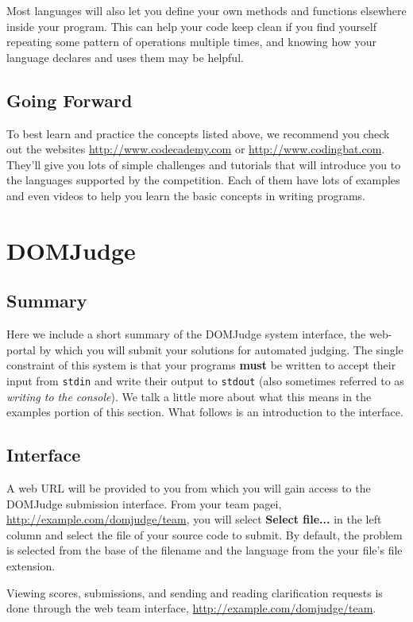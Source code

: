 \documentclass[a4paper]{article}
\begin{document}
Most languages will also let you define your own methods and functions elsewhere inside your program. This can help your code keep clean if you find yourself repeating some pattern of operations multiple times, and knowing how your language declares and uses them may be helpful.

\subsection{Going Forward}
To best learn and practice the concepts listed above, we recommend you check out the websites \url{http://www.codecademy.com} or \url{http://www.codingbat.com}. They'll give you lots of simple challenges and tutorials that will introduce you to the languages supported by the competition. Each of them have lots of examples and even videos to help you learn the basic concepts in writing programs.

\section{DOMJudge}
\subsection{Summary}
Here we include a short summary of the DOMJudge system interface, the web-portal by which you will submit your solutions for automated judging. The single constraint of this system is that your programs \textbf{must} be written to accept their input from \texttt{stdin} and write their output to \texttt{stdout} (also sometimes referred to as \textit{writing to the console}). We talk a little more about what this means in the examples portion of this section. What follows is an introduction to the interface.

\subsection{Interface}
A web URL will be provided to you from which you will gain access to the DOMJudge submission interface. From your team pagei, \url{http://example.com/domjudge/team}, you will select \textbf{Select file...} in the left column and select the file of your source code to submit. By default, the problem is selected from the base of the filename and the language from the your file's file extension. 

Viewing scores, submissions, and sending and reading clarification requests is done through the web team interface, \url{http://example.com/domjudge/team}. 
\end{document}
